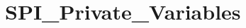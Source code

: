 \hypertarget{group___s_p_i___private___variables}{\section{S\-P\-I\-\_\-\-Private\-\_\-\-Variables}
\label{group___s_p_i___private___variables}
}
